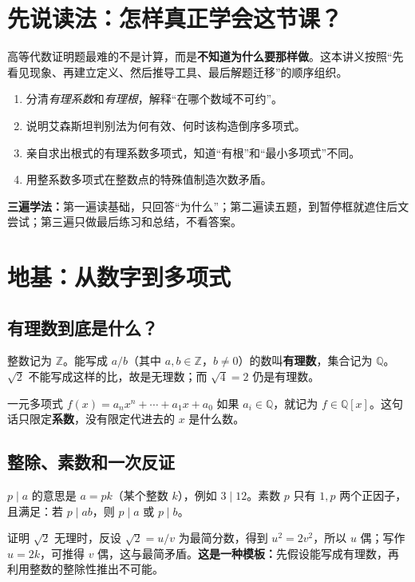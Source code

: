 \documentclass[12pt,a4paper,UTF8,fontset=none]{ctexart}
\begin{document}
\CourseCover
\section*{先说读法：怎样真正学会这节课？}
高等代数证明题最难的不是计算，而是\textbf{不知道为什么要那样做}。这本讲义按照“先看见现象、再建立定义、然后推导工具、最后解题迁移”的顺序组织。

\begin{takeawaybox}[你学完后应该能做到]
\begin{enumerate}[label=(\arabic*)]
\item 分清\emph{有理系数}和\emph{有理根}，解释“在哪个数域不可约”。
\item 说明艾森斯坦判别法为何有效、何时该构造倒序多项式。
\item 亲自求出根式的有理系数多项式，知道“有根”和“最小多项式”不同。
\item 用整系数多项式在整数点的特殊值制造次数矛盾。
\end{enumerate}
\end{takeawaybox}

\noindent\textbf{三遍学法：}第一遍读基础，只回答“为什么”；第二遍读五题，到暂停框就遮住后文尝试；第三遍只做最后练习和总结，不看答案。
\setcounter{tocdepth}{1}%
\tableofcontents
\clearpage

\section{地基：从数字到多项式}
\subsection{有理数到底是什么？}
整数记为 $\mathbb Z$。能写成 $a/b$（其中 $a,b\in\mathbb Z$，$b\ne0$）的数叫\textbf{有理数}，集合记为 $\mathbb Q$。$\sqrt2$ 不能写成这样的比，故是无理数；而 $\sqrt4=2$ 仍是有理数。

一元多项式 $f(x)=a_nx^n+\cdots+a_1x+a_0$ 如果 $a_i\in\mathbb Q$，就记为 $f\in\mathbb Q[x]$。这句话只限定\textbf{系数}，没有限定代进去的 $x$ 是什么数。

\subsection{整除、素数和一次反证}
$p\mid a$ 的意思是 $a=pk$（某个整数 $k$），例如 $3\mid12$。素数 $p$ 只有 $1,p$ 两个正因子，且满足：若 $p\mid ab$，则 $p\mid a$ 或 $p\mid b$。

证明 $\sqrt2$ 无理时，反设 $\sqrt2=u/v$ 为最简分数，得到 $u^2=2v^2$，所以 $u$ 偶；写作 $u=2k$，可推得 $v$ 偶，这与最简矛盾。\textbf{这是一种模板：}先假设能写成有理数，再利用整数的整除性推出不可能。
\end{document}
